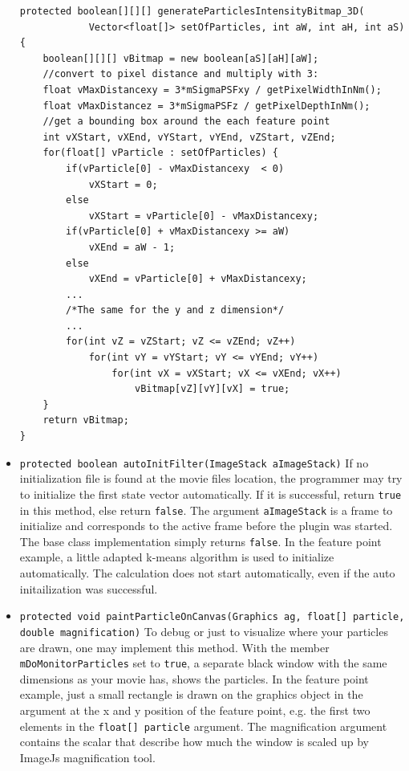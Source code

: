\documentclass{scrartcl}
\begin{document}
\begin{itemize}
\begin{lstlisting}
protected boolean[][][] generateParticlesIntensityBitmap_3D(
			Vector<float[]> setOfParticles, int aW, int aH, int aS) {
	boolean[][][] vBitmap = new boolean[aS][aH][aW];
	//convert to pixel distance and multiply with 3:
	float vMaxDistancexy = 3*mSigmaPSFxy / getPixelWidthInNm();
	float vMaxDistancez = 3*mSigmaPSFz / getPixelDepthInNm(); 
	//get a bounding box around the each feature point
	int vXStart, vXEnd, vYStart, vYEnd, vZStart, vZEnd;
	for(float[] vParticle : setOfParticles) {
		if(vParticle[0] - vMaxDistancexy  < 0) 
			vXStart = 0; 
		else 
			vXStart = vParticle[0] - vMaxDistancexy;			
		if(vParticle[0] + vMaxDistancexy >= aW) 
			vXEnd = aW - 1; 
		else 
			vXEnd = vParticle[0] + vMaxDistancexy;
		...
		/*The same for the y and z dimension*/
		...
		for(int vZ = vZStart; vZ <= vZEnd; vZ++) 
			for(int vY = vYStart; vY <= vYEnd; vY++)
				for(int vX = vXStart; vX <= vXEnd; vX++)
					vBitmap[vZ][vY][vX] = true;								
	}
	return vBitmap;
}	
\end{lstlisting}

\item{\lstinline{protected boolean autoInitFilter(ImageStack aImageStack)}} If no initialization file is found at the movie files location, the programmer may try to initialize the first state vector automatically. If it is successful, return \texttt{true} in this method, else return \texttt{false}. The argument \texttt{aImageStack} is a frame to initialize and corresponds to the active frame before the plugin was started. The base class implementation simply returns \texttt{false}. In the feature point example, a little adapted k-means algorithm is used to initialize automatically. The calculation does not start automatically, even if the auto initailization was successful.

\item{\lstinline{protected void paintParticleOnCanvas(Graphics ag, float[] particle, double magnification)}} To debug or just to visualize where your particles are drawn, one may implement this method. With the member \texttt{mDoMonitorParticles} set to \texttt{true}, a separate black window with the same dimensions as your movie has, shows the particles. In the feature point example, just a small rectangle is drawn on the graphics object in the argument at the x and y position of the feature point, e.g. the first two elements in the \texttt{float[] particle} argument. The magnification argument contains the scalar that describe how much the window is scaled up by ImageJs magnification tool.


\end{itemize}
\end{document}
